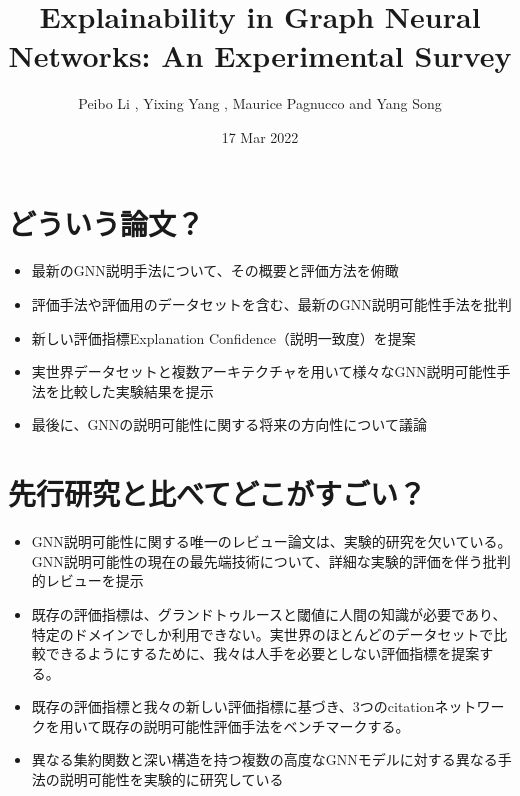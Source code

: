 \documentclass[a4paper,10pt]{ltjsarticle}
\title{Explainability in Graph Neural Networks: An Experimental Survey}
\author{Peibo Li , Yixing Yang , Maurice Pagnucco and Yang Song}
\date{17 Mar 2022}
\newcommand{\1}{\mbox{1}\hspace{-0.25em}\mbox{l}}
\theoremstyle{definition}
\begin{document}
    \maketitle



    \section{どういう論文？}
    \begin{itemize}
        \item 最新のGNN説明手法について、その概要と評価方法を俯瞰
        \item 評価手法や評価用のデータセットを含む、最新のGNN説明可能性手法を批判
        \item 新しい評価指標Explanation Confidence（説明一致度）を提案
        \item 実世界データセットと複数アーキテクチャを用いて様々なGNN説明可能性手法を比較した実験結果を提示
        \item 最後に、GNNの説明可能性に関する将来の方向性について議論
    \end{itemize}


    \section{先行研究と比べてどこがすごい？}
    \begin{itemize}
        \item GNN説明可能性に関する唯一のレビュー論文\cite{yuan2020explainability}は、実験的研究を欠いている。
        GNN説明可能性の現在の最先端技術について、詳細な実験的評価を伴う批判的レビューを提示
        \item 既存の評価指標は、グランドトゥルースと閾値に人間の知識が必要であり、特定のドメインでしか利用できない。実世界のほとんどのデータセットで比較できるようにするために、我々は人手を必要としない評価指標を提案する。
        \item 既存の評価指標と我々の新しい評価指標に基づき、3つのcitationネットワークを用いて既存の説明可能性評価手法をベンチマークする。
        \item 異なる集約関数と深い構造を持つ複数の高度なGNNモデルに対する異なる手法の説明可能性を実験的に研究している
    \end{itemize}
\end{document}
